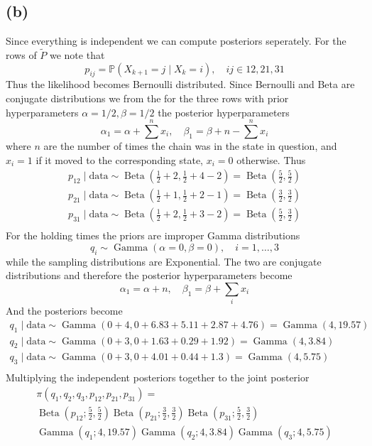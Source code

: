 \documentclass{article}
\DeclareMathOperator\Beta{Beta}
\DeclareMathOperator\GammaDist{Gamma}
\begin{document}
\subsection{(b)}
Since everything is independent we can compute posteriors seperately.
For the rows of $\tilde P$ we note that
$$ p_{ij} = \mathbb P(X_{k+1} = j \mid X_{k} = i), \quad ij \in {12, 21, 31} $$
Thus the likelihood becomes Bernoulli distributed.
Since Bernoulli and Beta are conjugate distributions
we from the for the three rows with
prior hyperparameters $\alpha = 1/2, \beta = 1/2$
the posterior hyperparameters
$$ \alpha_1 = \alpha + \sum^n x_i, \quad \beta_1 = \beta + n - \sum^n x_i $$
where $n$ are the number of times the chain was in the state in question,
and $x_i = 1$ if it moved to the corresponding state, $x_i = 0$ otherwise.
Thus
\begin{gather*}
	p_{12} \mid \text{data} \sim \Beta(\frac12 + 2, \frac12 + 4 - 2) = \Beta(\frac52, \frac52) \\
	p_{21} \mid \text{data} \sim \Beta(\frac12 + 1, \frac12 + 2 - 1) = \Beta(\frac32, \frac32) \\
	p_{31} \mid \text{data} \sim \Beta(\frac12 + 2, \frac12 + 3 - 2) = \Beta(\frac52, \frac32) \\
\end{gather*}
For the holding times the priors are improper Gamma distributions
$$ q_i \sim \GammaDist(\alpha = 0, \beta = 0), \quad i = 1, \ldots, 3 $$
while the sampling distributions are Exponential.
The two are conjugate distributions
and therefore the posterior hyperparameters become
$$ \alpha_1 = \alpha + n, \quad \beta_1 = \beta + \sum_i x_i $$
And the posteriors become
\begin{gather*}
	q_1 \mid \text{data} \sim \GammaDist(0 + 4, 0 + 6.83 + 5.11 + 2.87 + 4.76) = \GammaDist(4, 19.57) \\
	q_2 \mid \text{data} \sim \GammaDist(0 + 3, 0 + 1.63 + 0.29 + 1.92) = \GammaDist(4, 3.84) \\
	q_3 \mid \text{data} \sim \GammaDist(0 + 3, 0 + 4.01 + 0.44 + 1.3) = \GammaDist(4, 5.75) \\
\end{gather*}
Multiplying the independent posteriors together to the joint posterior
\begin{multline*}
	\pi(q_1, q_2, q_3, p_{12}, p_{21}, p_{31}) = \\
	\Beta(p_{12}; \frac52, \frac52) \Beta(p_{21}; \frac32, \frac32) \Beta(p_{31}; \frac52, \frac32) \\
	\GammaDist(q_1; 4, 19.57) \GammaDist(q_2; 4, 3.84) \GammaDist(q_3; 4, 5.75)
\end{multline*}
\end{document}
